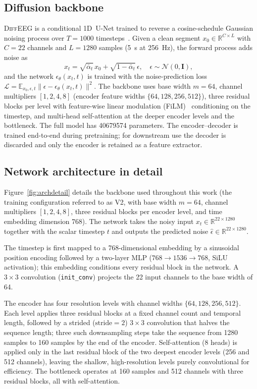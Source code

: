 \documentclass[journal]{IEEEtran}
\begin{document}
\subsection{Diffusion backbone}
\textsc{DiffEEG} is a conditional 1D~U-Net trained to reverse a cosine-schedule
Gaussian noising process over $T=1000$ timesteps~\cite{ho2020ddpm,nichol2021improved}.
Given a clean segment $x_0\in\mathbb{R}^{C\times L}$ with $C=22$ channels and
$L=1280$ samples (\SI{5}{\second} at \SI{256}{\hertz}), the forward process adds
noise as
\begin{equation}
x_t=\sqrt{\bar\alpha_t}\,x_0+\sqrt{1-\bar\alpha_t}\,\epsilon,\quad
\epsilon\sim\mathcal N(0,\mathbf I),
\end{equation}
and the network $\epsilon_\theta(x_t,t)$ is trained with the noise-prediction
loss $\mathcal L=\mathbb E_{x_0,\epsilon,t}\lVert\epsilon-\epsilon_\theta(x_t,t)\rVert^2$.
The backbone uses base width $m=64$, channel multipliers $[1,2,4,8]$ (encoder
feature widths $\{64,128,256,512\}$), three residual blocks per level with
feature-wise linear modulation (FiLM)~\cite{perez2018film} conditioning on the
timestep, and multi-head self-attention at the deeper encoder levels and the
bottleneck. The full model has \num{40679574} parameters. The encoder--decoder
is trained end-to-end during pretraining; for downstream use the decoder is
discarded and only the encoder is retained as a feature extractor.

\subsection{Network architecture in detail}
\label{sec:arch}
Figure~\ref{fig:archdetail} details the backbone used throughout this work
(the training configuration referred to as V2, with base width $m=64$,
channel multipliers $[1,2,4,8]$, three residual blocks per encoder level, and
time embedding dimension 768). The network takes the noisy input
$x_t\in\mathbb{R}^{22\times1280}$ together with the scalar timestep $t$ and
outputs the predicted noise $\hat\epsilon\in\mathbb{R}^{22\times1280}$.

The timestep is first mapped to a 768-dimensional embedding by a sinusoidal
position encoding followed by a two-layer MLP ($768\to1536\to768$, SiLU
activation); this embedding conditions every residual block in the network.
A $3\times3$ convolution (\texttt{init\_conv}) projects the 22 input channels
to the base width of 64.

The encoder has four resolution levels with channel widths
$\{64,128,256,512\}$. Each level applies three residual blocks at a fixed
channel count and temporal length, followed by a strided ($\mathrm{stride}=2$)
$3\times3$ convolution that halves the sequence length; three such
downsampling steps take the sequence from 1280 samples to 160 samples by the
end of the encoder. Self-attention (8 heads) is applied only in the last
residual block of the two deepest encoder levels (256 and 512 channels),
leaving the shallow, high-resolution levels purely convolutional for
efficiency. The bottleneck operates at 160 samples and 512 channels with
three residual blocks, all with self-attention.
\end{document}
